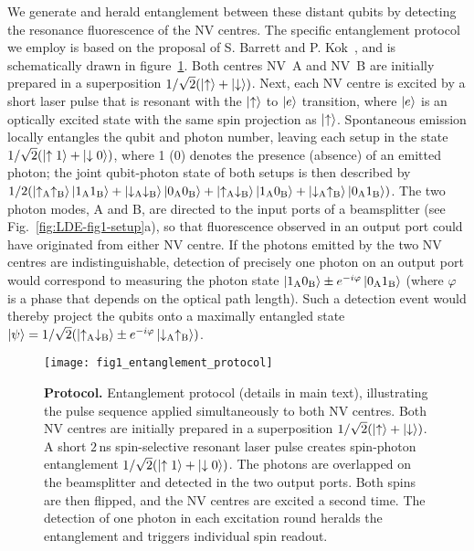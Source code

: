We generate and herald entanglement between these distant qubits by detecting the resonance fluorescence of the NV centres. The specific entanglement protocol we employ is based on the proposal of S. Barrett and P. Kok~\cite{Barrett_Nature_2004}, and is schematically drawn in figure~\ref{fig:LDE-fig1-protocol}. Both centres NV~A and NV~B are initially prepared in a superposition $1/\sqrt{2}(\left|\uparrow\right\rangle+\left|\downarrow\right\rangle)$. Next, each NV centre is excited by a short laser pulse that is resonant with the $\left|\uparrow\right\rangle$ to $\left|e\right\rangle$ transition, where $\left|e\right\rangle$ is an optically excited state with the same spin projection as $\left|\uparrow\right\rangle$. Spontaneous emission locally entangles the qubit and photon number, leaving each setup in the state $1/\sqrt{2}(\left|\uparrow 1\right\rangle+\left|\downarrow 0\right\rangle)$, where 1 (0) denotes the presence (absence) of an emitted photon; the joint qubit-photon state of both setups is then described by $1/2(\left|\uparrow_\text{A}\uparrow_\text{B}\right\rangle\left|1_\text{A}1_\text{B}\right\rangle+\left|\downarrow_\text{A}\downarrow_\text{B}\right\rangle\left|0_\text{A}0_\text{B}\right\rangle+\left|\uparrow_\text{A}\downarrow_\text{B}\right\rangle\left|1_\text{A}0_\text{B}\right\rangle+\left|\downarrow_\text{A}\uparrow_\text{B}\right\rangle\left|0_\text{A}1_\text{B}\right\rangle)$. The two photon modes, A and B, are directed to the input ports of a beamsplitter (see Fig.~\ref{fig:LDE-fig1-setup}a), so that fluorescence observed in an output port could have originated from either NV centre. If the photons emitted by the two NV centres are indistinguishable, detection of precisely one photon on an output port would correspond to measuring the photon state $\left|1_\text{A}0_\text{B}\right\rangle\pm e^{-i\varphi}\left|0_\text{A}1_\text{B}\right\rangle$ (where $\varphi$ is a phase that depends on the optical path length). Such a detection event would thereby project the qubits onto a maximally entangled state $\left|\psi\right\rangle=1/\sqrt{2}(\left|\uparrow_\text{A}\downarrow_\text{B}\right\rangle\pm e^{-i\varphi}\left|\downarrow_\text{A}\uparrow_\text{B}\right\rangle)$.
\begin{figure}[tp]
	\centering
	\texttt{[image: fig1\_entanglement\_protocol]}
	\caption{\label{fig:LDE-fig1-protocol} \textbf{Protocol.} Entanglement protocol (details in main text), illustrating the pulse sequence applied simultaneously to both NV centres. Both NV centres are initially prepared in a superposition $1/\sqrt{2}(\left|\uparrow\right\rangle+\left|\downarrow\right\rangle)$. A short $2\,$ns spin-selective resonant laser pulse creates spin-photon entanglement $1/\sqrt{2}(\left|\uparrow 1\right\rangle+\left|\downarrow 0\right\rangle)$. The photons are overlapped on the beamsplitter and detected in the two output ports. Both spins are then flipped, and the NV centres are excited a second time. The detection of one photon in each excitation round heralds the entanglement and triggers individual spin readout.}
\end{figure}


